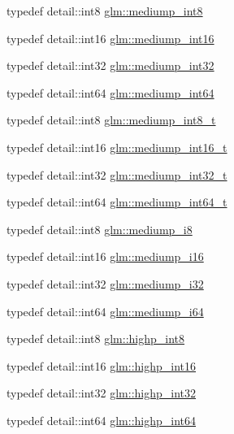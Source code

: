 \begin{CompactItemize}
\item 
typedef detail::int8 \hyperlink{group__gtc__type__precision_g3ee8faab2278c44c5785af04b7b18a14}{glm::mediump\_\-int8}
\item 
typedef detail::int16 \hyperlink{group__gtc__type__precision_g4611997edb6c61606daa11990cf08798}{glm::mediump\_\-int16}
\item 
typedef detail::int32 \hyperlink{group__gtc__type__precision_g0660a752402702f420f13c686a7fff29}{glm::mediump\_\-int32}
\item 
typedef detail::int64 \hyperlink{group__gtc__type__precision_g603c695fe5cd677d3f72a81343e19a74}{glm::mediump\_\-int64}
\item 
typedef detail::int8 \hyperlink{group__gtc__type__precision_g626ac5f73d3538e62a879d6c56abfb36}{glm::mediump\_\-int8\_\-t}
\item 
typedef detail::int16 \hyperlink{group__gtc__type__precision_g478fab608cf43040013d719a3e03b194}{glm::mediump\_\-int16\_\-t}
\item 
typedef detail::int32 \hyperlink{group__gtc__type__precision_gfd9b4bd9e4465aec63351b59100692c4}{glm::mediump\_\-int32\_\-t}
\item 
typedef detail::int64 \hyperlink{group__gtc__type__precision_g555a2f85641550c232db473a9bb981f7}{glm::mediump\_\-int64\_\-t}
\item 
typedef detail::int8 \hyperlink{group__gtc__type__precision_g28a8b5fd51072680bb55178c17cc7411}{glm::mediump\_\-i8}
\item 
typedef detail::int16 \hyperlink{group__gtc__type__precision_g8454fc6a82c7bb787d0ac9663e08f63d}{glm::mediump\_\-i16}
\item 
typedef detail::int32 \hyperlink{group__gtc__type__precision_g5e00ec824eb55968a6b6496f294d8c07}{glm::mediump\_\-i32}
\item 
typedef detail::int64 \hyperlink{group__gtc__type__precision_g90fedf6c701ffbe00535156715e50787}{glm::mediump\_\-i64}
\item 
typedef detail::int8 \hyperlink{group__gtc__type__precision_g57c86999e666760c304453f9bfdc09d1}{glm::highp\_\-int8}
\item 
typedef detail::int16 \hyperlink{group__gtc__type__precision_gf0430ed80e88c0d1dfbe47f359659c81}{glm::highp\_\-int16}
\item 
typedef detail::int32 \hyperlink{group__gtc__type__precision_ga2045c92b9553d463191af6a20e997bb}{glm::highp\_\-int32}
\item 
typedef detail::int64 \hyperlink{group__gtc__type__precision_g7ffb27943e9569800979081bc548621c}{glm::highp\_\-int64}

\end{CompactItemize}

